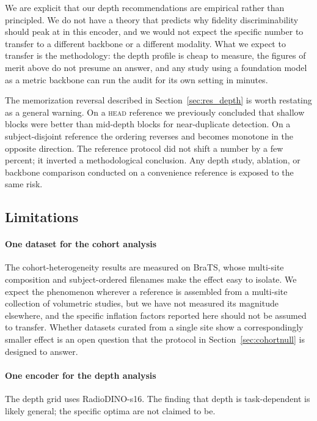 We are explicit that our depth recommendations are empirical rather than
principled. We do not have a theory that predicts why fidelity discriminability
should peak at  in this encoder, and we would not expect the specific
number to transfer to a different backbone or a different modality. What we
expect to transfer is the methodology: the depth profile is cheap to measure,
the figures of merit above do not presume an answer, and any study using a
foundation model as a metric backbone can run the audit for its own setting in
minutes.

The memorization reversal described in Section~\ref{sec:res_depth} is worth
restating as a general warning. On a \textsc{head} reference we previously
concluded that shallow blocks were better than mid-depth blocks for
near-duplicate detection. On a subject-disjoint reference the ordering reverses
and becomes monotone in the opposite direction. The reference protocol did not
shift a number by a few percent; it inverted a methodological conclusion. Any
depth study, ablation, or backbone comparison conducted on a convenience
reference is exposed to the same risk.

\subsection{Limitations}

\paragraph{One dataset for the cohort analysis}
The cohort-heterogeneity results are measured on BraTS, whose multi-site
composition and subject-ordered filenames make the effect easy to isolate. We
expect the phenomenon wherever a reference is assembled from a multi-site
collection of volumetric studies, but we have not measured its magnitude
elsewhere, and the specific inflation factors reported here should not be
assumed to transfer. Whether datasets curated from a single site show a
correspondingly smaller effect is an open question that the protocol in
Section~\ref{sec:cohortnull} is designed to answer.

\paragraph{One encoder for the depth analysis}
The depth grid uses RadioDINO-s16. The finding that depth is task-dependent is
likely general; the specific optima are not claimed to be.

